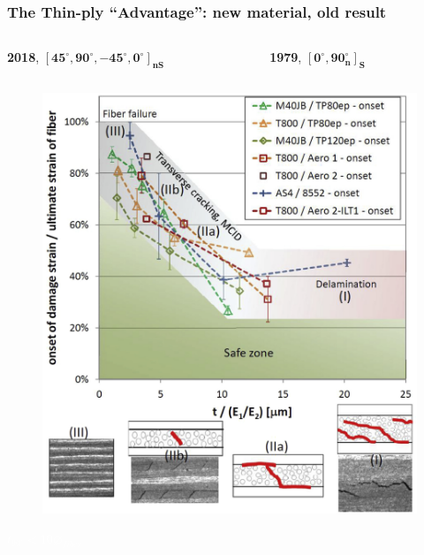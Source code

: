 \documentclass[first,firstsupp,lastsupp,last,hyperref,table]{ETHclass}
\begin{document}
\addtocounter{framenumber}{-1}

\begin{frame}
\frametitle{\vspace{0.3cm}\small The Thin-ply ``Advantage'': new material, old result}
\vspace{-0.8cm}
\centering
\begin{columns}[t]
\begin{column}{0.5\textwidth}
\centering
\tiny
\textbf{2018}, $\mathbf{\left[45^{\circ}, 90^{\circ},-45^{\circ},0^{\circ}\right]_{nS}}$
\end{column}
\begin{column}{0.5\textwidth}
\centering
\tiny
\textbf{1979}, $\mathbf{\left[0^{\circ}, 90^{\circ}_{n}\right]_{S}}$
\end{column}
\end{columns}
\vspace{-0.4cm}
\begin{columns}[c]
\begin{column}{0.5\textwidth}
\begin{figure}
\centering
\includegraphics[width=0.9\columnwidth]{thinply-plythicknesseffect.jpg}
\end{figure}
\vspace{-0.6cm}
\centering
\textcolor{white}{\tiny$t_{90^{\circ}}<10\diameter_{fiber}$}

\end{column}
\end{columns}
\end{frame}
\end{document}
